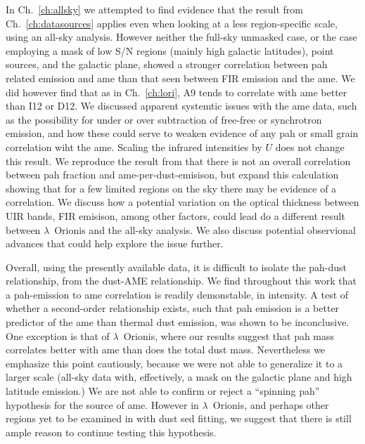   In Ch.~\ref{ch:allsky} we attempted to find evidence that the result from Ch.~\ref{ch:datasources} applies even when looking at a less region-specific scale, using an all-sky analysis. However neither the full-sky unmasked case, or the case employing a mask of low S/N regions (mainly high galactic latitudes), point sources, and the galactic plane, showed a stronger correlation between \acrshort{pah} related emission and \acrshort{ame} than that seen between FIR emission and the \acrshort{ame}. We did however find that as in Ch.~\ref{ch:lori}, A9 tends to correlate with \acrshort{ame} better than I12 or D12. We discussed apparent systemtic issues with the \acrshort{ame} data, such as the possibility for under or over subtraction of free-free or synchrotron emission, and how these could serve to weaken evidence of any \acrshort{pah} or small grain correlation wiht the \acrshort{ame}. Scaling the infrared intensities by $U$ does not change this result. We reproduce the result from \cite{hensley16} that there is not an overall correlation between \acrshort{pah} fraction and \acrshort{ame}-per-dust-emisison, but expand this calculation showing that for a few limited regions on the sky there may be evidence of a correlation. We discuss how a potential variation on the optical thickness between UIR bands, FIR emisison, among other factors, could lead do a different result between $\lambda$~Orionis and the all-sky analysis. We also discuss potential observional advances that could help explore the issue further.

  Overall, using the presently available data, it is difficult to isolate the \acrshort{pah}-dust relationship, from the dust-AME relationship. We find throughout this work that a \acrshort{pah}-emission to \acrshort{ame} correlation is readily demonstable, in intensity. A test of whether a second-order relationship exists, such that \acrshort{pah} emission is a better predictor of the \acrshort{ame} than thermal dust emission, was shown to be inconclusive. One exception is that of $\lambda$~Orionis, where our results suggest that \acrshort{pah} mass correlates better with \acrshort{ame} than does the total dust mass. Nevertheless we emphasize this point cautiously, because we were not able to generalize it to a larger scale (all-sky data with, effectively, a mask on the galactic plane and high latitude emission.)  We are not able to confirm or reject a ``spinning \acrshort{pah}'' hypothesis for the source of \acrshort{ame}. However in $\lambda$~Orionis, and perhaps other regions yet to be examined in with dust \acrshort{sed} fitting, we suggest that there is still ample reason to continue testing this hypothesis.
